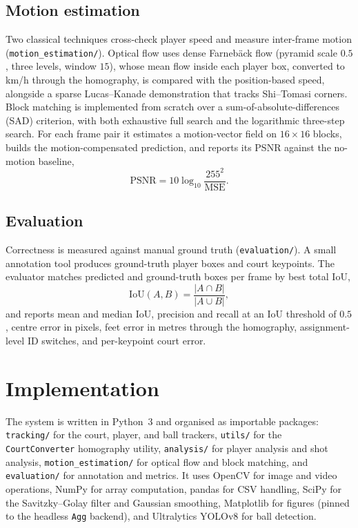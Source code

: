 \documentclass[11pt]{article}
\begin{document}
\subsection{Motion estimation}
Two classical techniques cross-check player speed and measure inter-frame motion (\texttt{motion\_estimation/}). Optical flow uses dense Farneb\"ack flow (pyramid scale $0.5$, three levels, window $15$), whose mean flow inside each player box, converted to km/h through the homography, is compared with the position-based speed, alongside a sparse Lucas--Kanade demonstration that tracks Shi--Tomasi corners. Block matching is implemented from scratch over a sum-of-absolute-differences (SAD) criterion, with both exhaustive full search and the logarithmic three-step search. For each frame pair it estimates a motion-vector field on $16\times16$ blocks, builds the motion-compensated prediction, and reports its PSNR against the no-motion baseline,
\begin{equation}
\text{PSNR} = 10\log_{10}\frac{255^2}{\text{MSE}}.
\end{equation}

\subsection{Evaluation}
Correctness is measured against manual ground truth (\texttt{evaluation/}). A small annotation tool produces ground-truth player boxes and court keypoints. The evaluator matches predicted and ground-truth boxes per frame by best total IoU,
\begin{equation}
\text{IoU}(A,B) = \frac{|A\cap B|}{|A\cup B|},
\end{equation}
and reports mean and median IoU, precision and recall at an IoU threshold of $0.5$, centre error in pixels, feet error in metres through the homography, assignment-level ID switches, and per-keypoint court error.

\section{Implementation}
The system is written in Python~3 and organised as importable packages: \texttt{tracking/} for the court, player, and ball trackers, \texttt{utils/} for the \texttt{CourtConverter} homography utility, \texttt{analysis/} for player analysis and shot analysis, \texttt{motion\_estimation/} for optical flow and block matching, and \texttt{evaluation/} for annotation and metrics. It uses OpenCV for image and video operations, NumPy for array computation, pandas for CSV handling, SciPy for the Savitzky--Golay filter and Gaussian smoothing, Matplotlib for figures (pinned to the headless \texttt{Agg} backend), and Ultralytics YOLOv8 for ball detection.
\end{document}
